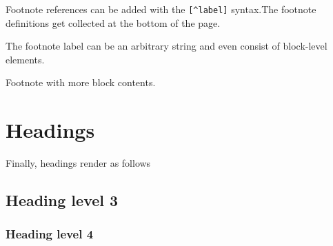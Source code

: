 \label{16845496644619434430}{}


Footnote references can be added with the \texttt{[{\textasciicircum}label]} syntax.\footnotemark[1] The footnote definitions get collected at the bottom of the page.



The footnote label can be an arbitrary string and even consist of block-level elements.\footnotemark[2]







Footnote with more block contents.\footnotemark[3]





\section{Headings}



\label{5680510222270408269}{}


Finally, headings render as follows



\subsection{Heading level 3}



\label{13085847155693612023}{}


\subsubsection{Heading level 4}



